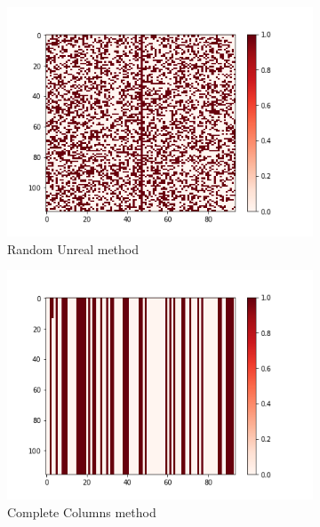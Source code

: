 \documentclass[10pt, conference, compsocconf]{IEEEtran}
\begin{document}
\begin{figure}[h!]
	\centering
	\begin{subfigure}[b]{0.4\linewidth}
		\includegraphics[width=\columnwidth]{figures/5vs7_random-unreal_04_training}
  		\caption{Random Unreal method}
  		\label{fig:Random-Unreal-Sample-Training-set}
	\end{subfigure}
	\begin{subfigure}[b]{0.4\linewidth}
  		\includegraphics[width=\columnwidth]{figures/5vs7_columns_04_training}
  		\caption{Complete Columns method}
  		\label{fig:Columns-Sample-Training-set}
	\end{subfigure}
	\begin{subfigure}[b]{0.4\linewidth}

\end{subfigure}
\end{figure}
\end{document}

